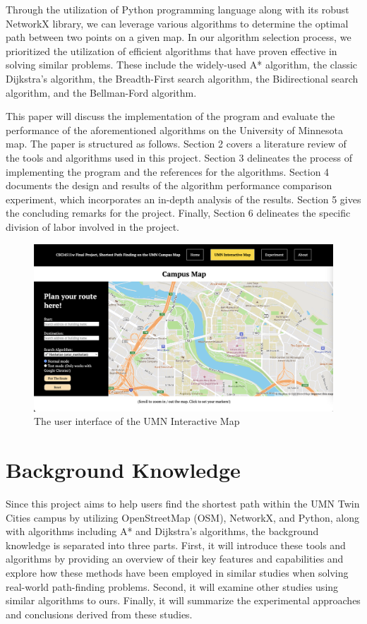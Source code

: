 \documentclass[12pt]{article}
\begin{document}
Through the utilization of Python programming language along with its robust NetworkX library, we can leverage various algorithms to determine the optimal path between two points on a given map. In our algorithm selection process, we prioritized the utilization of efficient algorithms that have proven effective in solving similar problems. These include the widely-used A* algorithm, the classic Dijkstra's algorithm, the Breadth-First search algorithm, the Bidirectional search algorithm, and the Bellman-Ford algorithm.

This paper will discuss the implementation of the program and evaluate the performance of the aforementioned algorithms on the University of Minnesota map. The paper is structured as follows. Section 2 covers a literature review of the tools and algorithms used in this project. Section 3 delineates the process of implementing the program and the references for the algorithms. Section 4 documents the design and results of the algorithm performance comparison experiment, which incorporates an in-depth analysis of the results. Section 5 gives the concluding remarks for the project. Finally, Section 6 delineates the specific division of labor involved in the project.


\begin{figure}[ht]
\centering
\includegraphics[scale=0.3]{images/map_ui.png}
\caption{The user interface of the UMN Interactive Map}
\label{fig: map ui}
\end{figure}


\section{Background Knowledge}

Since this project aims to help users find the shortest path within the UMN Twin Cities campus by utilizing OpenStreetMap (OSM), NetworkX, and Python, along with algorithms including A* and Dijkstra’s algorithms, the background knowledge is separated into three parts. First, it will introduce these tools and algorithms by providing an overview of their key features and capabilities and explore how these methods have been employed in similar studies when solving real-world path-finding problems. Second, it will examine other studies using similar algorithms to ours. Finally, it will summarize the experimental approaches and conclusions derived from these studies.
\end{document}
